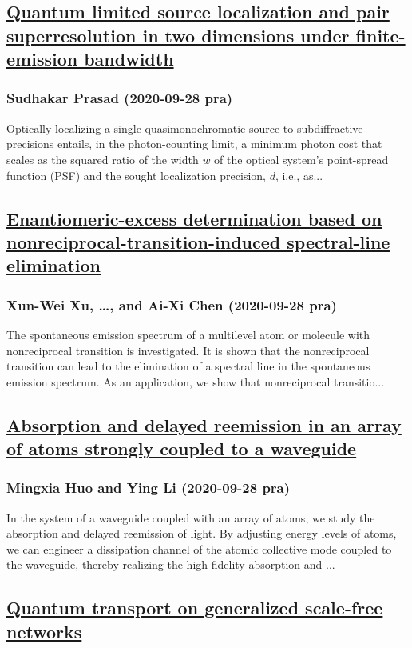 \subsection*{\href{http://link.aps.org/doi/10.1103/PhysRevA.102.033726}{Quantum limited source localization and pair superresolution in two dimensions under finite-emission bandwidth}}
\subsubsection*{Sudhakar Prasad (2020-09-28 pra)}
Optically localizing a single quasimonochromatic source to subdiffractive precisions entails, in the photon-counting limit, a minimum photon cost that scales as the squared ratio of the width $w$ of the optical system's point-spread function (PSF) and the sought localization precision, $d$, i.e., as...
\subsection*{\href{http://link.aps.org/doi/10.1103/PhysRevA.102.033727}{Enantiomeric-excess determination based on nonreciprocal-transition-induced spectral-line elimination}}
\subsubsection*{Xun-Wei Xu, \dots, and Ai-Xi Chen (2020-09-28 pra)}
The spontaneous emission spectrum of a multilevel atom or molecule with nonreciprocal transition is investigated. It is shown that the nonreciprocal transition can lead to the elimination of a spectral line in the spontaneous emission spectrum. As an application, we show that nonreciprocal transitio...
\subsection*{\href{http://link.aps.org/doi/10.1103/PhysRevA.102.033728}{Absorption and delayed reemission in an array of atoms strongly coupled to a waveguide}}
\subsubsection*{Mingxia Huo and Ying Li (2020-09-28 pra)}
In the system of a waveguide coupled with an array of atoms, we study the absorption and delayed reemission of light. By adjusting energy levels of atoms, we can engineer a dissipation channel of the atomic collective mode coupled to the waveguide, thereby realizing the high-fidelity absorption and ...
\subsection*{\href{http://link.aps.org/doi/10.1103/PhysRevA.102.032219}{Quantum transport on generalized scale-free networks}}
